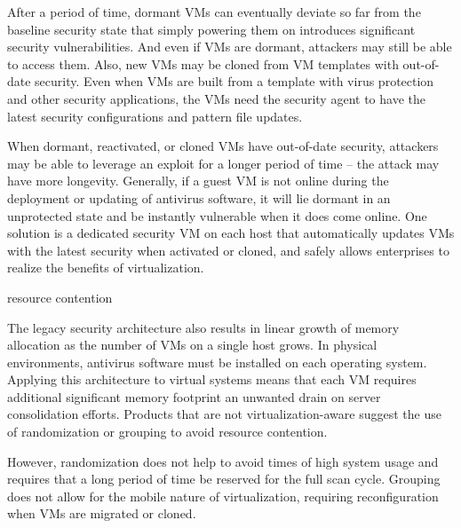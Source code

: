 After a period of time, dormant VMs can eventually deviate so far from the baseline security state that simply powering them on introduces significant security vulnerabilities. And even if VMs are dormant, attackers may still be able to access them. Also, new VMs may be cloned from VM templates with out-of-date security. Even when VMs are built from a template with virus protection and other security applications, the VMs need the security agent to have the latest security configurations and pattern file updates.

When dormant, reactivated, or cloned VMs have out-of-date security, attackers may be able to leverage an exploit for a longer period of time – the attack may have more longevity. Generally, if a guest VM is not online during the deployment or updating of antivirus software, it will lie dormant in an unprotected state and be instantly vulnerable when it does come online. One solution is a dedicated security VM on each host that automatically updates VMs with the latest security when activated or cloned, and safely allows enterprises to realize the benefits of virtualization.

resource contention 


The legacy security architecture also results in linear growth of memory allocation as the number of VMs on a single host grows. In physical environments, antivirus software must be installed on each operating system. Applying this architecture to virtual systems means that each VM requires additional significant memory footprint  an unwanted drain on server consolidation efforts.
Products that are not virtualization-aware suggest the use of randomization or grouping to avoid resource contention.

However, randomization does not help to avoid times of high system usage and requires that a long period of time be reserved for the full scan cycle. Grouping does not allow for the mobile nature of virtualization, requiring reconfiguration when VMs are migrated or cloned.




